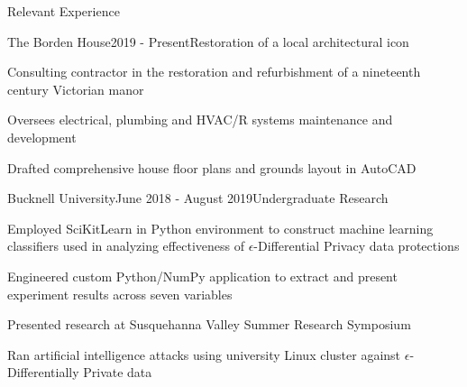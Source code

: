 \documentclass{resume} %
\begin{document}

\begin{rSection}{Relevant Experience}


\begin{rWorkSubsection}{The Borden House}{2019 - Present}{Restoration of a local architectural icon}{}
\item Consulting contractor in the restoration and refurbishment of a nineteenth century Victorian manor
\item Oversees electrical, plumbing and HVAC/R systems maintenance and development
\item Drafted comprehensive house floor plans and grounds layout in AutoCAD
\end{rWorkSubsection}
\iffalse
\begin{rWorkSubsection}{Nooch's Pub and Grill}{November 2019 - Present}{A Stinking Cook}{}
\item Who the fuck cares?
\end{rWorkSubsection}


\begin{rWorkSubsection}{Private Family}{October 2019 - Present}{Fourth Grade Math and Computer Science Tutor}{}
\item Provides intensive, one-on-one tutoring in math and computer science
\item Utilizes Unity to create lesson plans and curricula tailored to student's needs  
\item Blends foundational math practice with the introduction of mid and high level concepts to actively engage the children's minds and activate an interest-based approach to drilling and repetition
\end{rWorkSubsection}
\fi
\iffalse
\begin{rWorkSubsection}{Bucknell University}{June 2018 - August 2019}{Undergraduate Research}{}
\item Employed SciKitLearn in Python environment to construct machine learning classifiers used in analyzing effectiveness of $\epsilon$-Differential Privacy data protections
\item Engineered custom Python/NumPy application to extract and present experiment results across seven variables
\item Presented research at Susquehanna Valley Summer Research Symposium
\item Ran artificial intelligence attacks using university Linux cluster against $\epsilon$-Differentially Private data
\end{rWorkSubsection}


\end{rSection}
\end{document}
